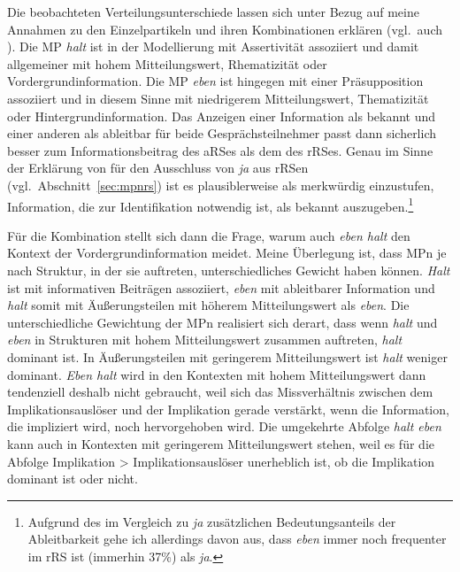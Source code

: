 \noindent
Die beobachteten Verteilungsunterschiede lassen sich unter Bezug auf meine Annahmen zu den Einzelpartikeln und ihren Kombinationen erklären (vgl.\ auch \citealt[172--173]{Mueller2016a}). Die MP \textit{halt} ist in der Modellierung mit Assertivität  assoziiert und damit allgemeiner mit hohem Mitteilungswert, Rhematizität  oder  Vordergrundinformation. Die MP \textit{eben} ist hingegen mit einer Präsupposition assoziiert und in diesem Sinne mit  niedrigerem Mitteilungswert, Thematizität  oder Hintergrundinformation. Das Anzeigen einer Information als bekannt und einer anderen als ableitbar für beide Gesprächsteilnehmer passt dann sicherlich besser zum Informationsbeitrag des aRSes als dem des rRSes. Genau im Sinne der Er\-klärung von \citet{Hentschel1986} für den Ausschluss von \textit{ja} aus rRSen (vgl.\ Abschnitt~\ref{sec:mpnrs}) ist es plausiblerweise als merkwürdig einzustufen, Information, die zur Identifikation notwendig ist, als bekannt auszugeben.\footnote{Aufgrund des im Vergleich zu \textit{ja} zusätzlichen Bedeutungsanteils der Ableitbarkeit gehe ich allerdings davon aus, dass \textit{eben} immer noch frequenter im rRS ist (immerhin 37\%) als \textit{ja}.}

Für die Kombination stellt sich dann die Frage, warum auch \textit{eben halt} den Kontext der Vordergrundinformation meidet. Meine Überlegung ist, dass MPn je nach Struktur, in der sie auftreten, unterschiedliches Gewicht haben können. \textit{Halt} ist mit informativen Beiträgen assoziiert, \textit{eben} mit ableitbarer Information und \textit{halt} somit mit Äußerungsteilen mit höherem Mitteilungswert als \textit{eben}. Die unterschiedliche Gewichtung der MPn realisiert sich derart, dass wenn \textit{halt} und \textit{eben} in Strukturen mit hohem Mitteilungswert zusammen auftreten, \textit{halt} do\-minant ist. In Äußerungsteilen mit geringerem Mitteilungswert ist \textit{halt} weniger dominant. \textit{Eben halt} wird in den Kontexten mit hohem Mitteilungswert dann tendenziell deshalb nicht gebraucht, weil sich das Missverhältnis zwischen dem Implikationsauslöser und der Implikation gerade verstärkt, wenn die Information, die impliziert wird, noch hervorgehoben wird. Die umgekehrte Abfolge \textit{halt eben} kann auch in Kontexten mit geringerem Mitteilungswert stehen, weil es für die Abfolge Implikation > Implikationsauslöser unerheblich ist, ob die Implikation dominant ist oder nicht.

